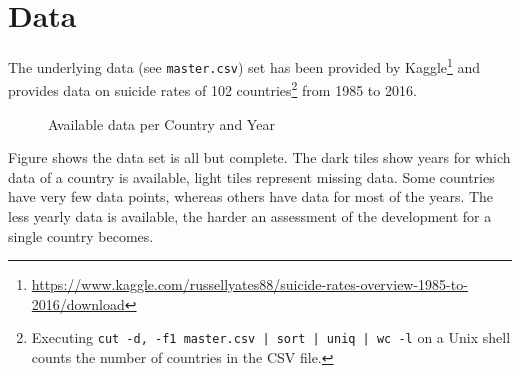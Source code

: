 \section{Data}

The underlying data (see \texttt{master.csv}) set has been provided by Kaggle\footnote{\url{https://www.kaggle.com/russellyates88/suicide-rates-overview-1985-to-2016/download}} and provides data on suicide rates of 102 countries\footnote{Executing \texttt{cut -d, -f1 master.csv | sort | uniq | wc -l} on a Unix shell counts the number of countries in the CSV file.} from 1985 to 2016.

\begin{figure}
    \centering
    \caption{Available data per Country and Year}
    \label{fig:available-data}
\end{figure}

Figure  shows the data set is all but complete. The dark tiles show years for which data of a country is available, light tiles represent missing data. Some countries have very few data points, whereas others have data for most of the years. The less yearly data is available, the harder an assessment of the development for a single country becomes.

